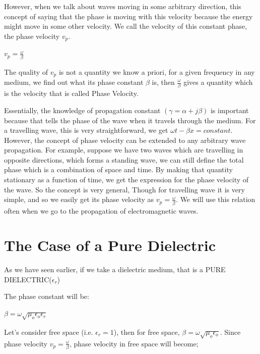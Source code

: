 However, when we talk about waves moving in some arbitrary direction, this concept of saying that the phase is moving with this velocity because the energy might move in some other velocity. We call the velocity of this constant phase, the phase velocity $ v_p $.

\begin{center}
$ v_p=\frac{\omega}{\beta} $
\end{center}

The quality of $ v_p $ is not a quantity we know a priori, for a given frequency in any medium, we find out what its phase constant $\beta  $ is, then $\frac{\omega}{\beta}$ gives a quantity which is the velocity that is called Phase Velocity.

Essentially, the knowledge of propagation constant $(\gamma=\alpha+j\beta)$ is important because that tells the phase of the wave when it travels through the medium.
For a travelling wave, this is very straightforward, we get $ \omega t-\beta x=constant $. However, the concept of phase velocity can be extended to any arbitrary wave propagation. For example, suppose we have two waves which are travelling in opposite directions, which forms a standing wave, we can still define the total phase which is a combination of space and time. By making that quantity stationary as a function of time, we get the expression for the phase velocity of the wave. So the concept is very general, Though for travelling wave it is very simple, and so we easily get its phase velocity as $v_p=\frac{\omega}{\beta}.$ We will use this relation often when we go to the propagation of electromagnetic waves.\newline

\section{\textbf{The Case of a Pure Dielectric}}

As we have seen earlier, if we take a dielectric medium, that is a PURE DIELECTRIC($\epsilon_{r}$)

The phase constant will be:

\begin{center}
$\beta=\omega\sqrt{\mu_{o}\epsilon_{o}\epsilon_{r}}$ 
\end{center}

Let's consider free space (i.e. $\epsilon_{r}=1 $), then for free space, $\beta=\omega\sqrt{\mu_{o}\epsilon_{o}}$.
Since phase velocity $v_p=\frac{\omega}{\beta}$, phase velocity in free space will become;

